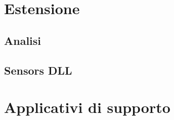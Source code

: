 
\section{Estensione}\label{sec:sensors-rte}

\subsection{Analisi}

\subsection{Sensors DLL}

\section{Applicativi di supporto}
